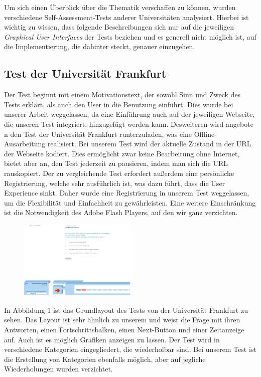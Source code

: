 \label{Jonas}
Um sich einen Überblick über die Thematik verschaffen zu können, wurden verschiedene Self-Assessment-Tests anderer Universitäten analysiert. Hierbei ist wichtig zu wissen, dass folgende Beschreibungen sich nur auf die jeweiligen \textit{Graphical User Interfaces} der Tests beziehen und es generell nicht möglich ist, auf die Implementierung, die dahinter steckt, genauer einzugehen.\break
\subsection{Test der Universität Frankfurt}
Der Test beginnt mit einem Motivationstext, der sowohl Sinn und Zweck des Tests erklärt, als auch den User in die Benutzung einführt. Dies wurde bei unserer Arbeit weggelassen, da eine Einführung auch auf der jeweiligen Webseite, die unseren Test integriert, hinzugefügt werden kann. Desweiteren wird angebote n den Test der Universität Frankfurt runterzuladen, was eine Offline-Ausarbeitung realisiert. Bei unserem Test wird der aktuelle Zustand in der URL der Webseite kodiert. Dies ermöglicht zwar keine Bearbeitung ohne Internet, bietet aber an, den Test jederzeit zu pausieren, indem man sich die URL rauskopiert. Der zu vergleichende Test erfordert außerdem eine persönliche Registrierung, welche sehr ausführlich ist, was dazu führt, dass die User Experience sinkt. Daher wurde eine Registrierung in unserem Test weggelassen, um die Flexibilität und Einfachheit zu gewährleisten. Eine weitere Einschränkung ist die Notwendigkeit des Adobe Flash Players, auf den wir ganz verzichten. 
\begin{figure}[htbp] 
  \centering
     \includegraphics[width=0.5\textwidth]{Jonas_Images/frankfurt1.png}
  \caption{}
  \label{fig:Bild1}
\end{figure}
In Abbildung 1 ist das Grundlayout des Tests von der Universität Frankfurt zu sehen\cite{Frankfurt}. Das Layout ist sehr ähnlich zu unserem und weist die Frage mit ihren Antworten, einen Fortschrittsbalken, einen Next-Button und einer Zeitanzeige auf. Auch ist es möglich Grafiken anzeigen zu lassen. Der Test wird in verschiedene Kategorien eingegliedert, die wiederholbar sind. Bei unserem Test ist die Erstellung von Kategorien ebenfalls möglich, aber auf jegliche Wiederholungen wurden verzichtet.
